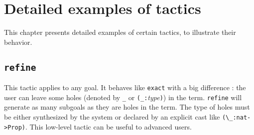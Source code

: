 \chapter[Detailed examples of tactics]{Detailed examples of tactics\label{Tactics-examples}}

This chapter presents detailed examples of certain tactics, to
illustrate their behavior.

\section[\tt refine]{\tt refine
\label{refine-example}}

This tactic applies to any goal. It behaves like {\tt exact} with a
big difference : the user can leave some holes (denoted by \texttt{\_} or 
{\tt (\_:}{\it type}{\tt )}) in the term. 
{\tt refine} will generate as many
subgoals as they are holes in the term. The type of holes must be
either synthesized by the system or declared by an
explicit cast like \verb|(\_:nat->Prop)|. This low-level
tactic can be useful to advanced users.

\Example

